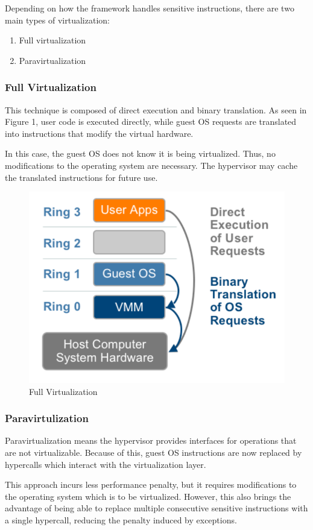 Depending on how the framework handles sensitive instructions, there are two main types of virtualization\cite{vmware}:
\begin{enumerate}
\item
Full virtualization
\item
Paravirtualization
\end{enumerate}

\subsubsection{Full Virtualization}
\label{subsubsec:fullvirt}

This technique is composed of direct execution and binary translation.
As seen in Figure 1, user code is executed directly, while guest OS requests are translated into instructions that modify the virtual hardware.

In this case, the guest OS does not know it is being virtualized. Thus, no modifications to the operating system are necessary. The hypervisor may cache the translated instructions for future use.

\begin{figure}[h]
\centering
  \includegraphics[width=.35\linewidth]{img/fullvirt.png}
  \caption{Full Virtualization\cite{vmware}}
\end{figure}


\subsubsection{Paravirtulization}
\label{subsubsec:paravirt}

Paravirtualization means the hypervisor provides interfaces for operations that are not virtualizable. Because of this, guest OS instructions are now replaced by hypercalls which interact with the virtualization layer.

This approach incurs less performance penalty, but it requires modifications to the operating system which is to be virtualized. However, this also brings the advantage of being able to replace multiple consecutive sensitive instructions with a single hypercall, reducing the penalty induced by exceptions\cite{virt-embedded}.

